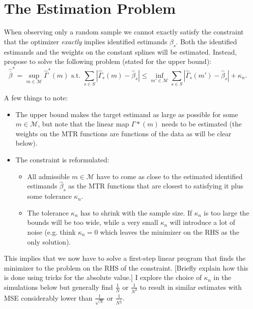 \documentclass[11pt, a4paper, leqno]{article}
\begin{document}
\section{The Estimation Problem}
When observing only a random sample we cannot exactly satisfy the constraint that the optimizer \textit{exactly} implies identified estimands $\beta_s$.
Both the identified estimands and the weights on the constant splines will be estimated. Instead, \citet{mogstad2018using} propose to solve the following problem (stated for the upper bound):
\begin{equation*}
    \label{eq:est_lp}
    \hat{\overline{\beta}}^* = \sup_{m\in\mathcal{M}} \hat{\Gamma}^*(m) \text{ s.t. } \sum_{s\in S}|\hat{\Gamma}_s(m) - \hat{\beta}_s| \leq \inf_{m'\in\mathcal{M}} \sum_{s\in S}|\hat{\Gamma}_s(m') - \hat{\beta}_s| + \kappa_n.
\end{equation*}

A few things to note:
\begin{itemize}
    \item The upper bound makes the target estimand as large as possible for some $m\in\mathcal{M}$, but note that the linear map $\Gamma*(m)$ needs to be estimated (the weights on the MTR functions are functions of the data as will be clear below).
    \item The constraint is reformulated:
    \begin{itemize}
        \item All admissible $m\in\mathcal{M}$ have to come as close to the estimated identified estimands $\hat{\beta}_s$ as the MTR functions that are closest to satisfying it plus some tolerance $\kappa_n$.
        \item The tolerance $\kappa_n$ has to shrink with the sample size. If $\kappa_n$ is too large the bounds will be too wide, while a very small $\kappa_n$ will introduce a lot of noise (e.g. think $\kappa_n = 0$ which leaves the minimizer on the RHS as the only solution).
    \end{itemize}
\end{itemize}

This implies that we now have to solve a first-step linear program that finds the minimizer to the problem on the RHS of the constraint. [Briefly explain how this is done using tricks for the absolute value.]
I explore the choice of $\kappa_n$ in the simulations below but generally find $\frac{1}{N}$ or $\frac{1}{N^2}$ to result in similar estimates with MSE considerably lower than $\frac{1}{\sqrt{N}}$ or $\frac{1}{N^\frac{1}{4}}$.
\end{document}

